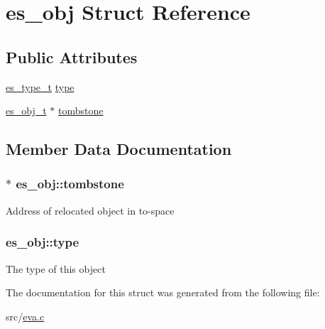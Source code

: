 \hypertarget{structes__obj}{\section{es\-\_\-obj Struct Reference}
\label{structes__obj}
}
\subsection*{Public Attributes}
\begin{DoxyCompactItemize}
\item 
\hyperlink{eva_8h_a5e339d4bb9b9196f21973d1a815764d4}{es\-\_\-type\-\_\-t} \hyperlink{structes__obj_aca9f460e4aea5afeeb7f6ed39d2e002d}{type}
\item 
\hyperlink{eva_8h_a3370a89a85f5ff467ca5e7dba47e63bc}{es\-\_\-obj\-\_\-t} $\ast$ \hyperlink{structes__obj_a0f8cc669207fe8e760f222981c3888b4}{tombstone}
\end{DoxyCompactItemize}


\subsection{Member Data Documentation}
\hypertarget{structes__obj_a0f8cc669207fe8e760f222981c3888b4}{
\subsubsection[{tombstone}]{$\ast$ es\-\_\-obj\-::tombstone}}\label{structes__obj_a0f8cc669207fe8e760f222981c3888b4}
Address of relocated object in to-\/space \hypertarget{structes__obj_aca9f460e4aea5afeeb7f6ed39d2e002d}{
\subsubsection[{type}]{ es\-\_\-obj\-::type}}\label{structes__obj_aca9f460e4aea5afeeb7f6ed39d2e002d}
The type of this object 

The documentation for this struct was generated from the following file\-:\begin{DoxyCompactItemize}
\item 
src/\hyperlink{eva_8c}{eva.\-c}\end{DoxyCompactItemize}
